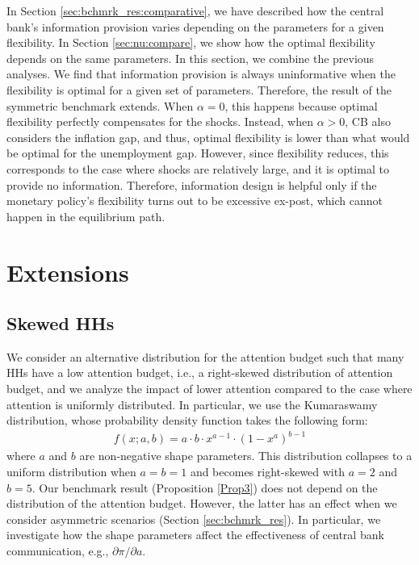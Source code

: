 \documentclass[12pt,a4paper]{article}
\begin{document}
In Section \ref{sec:bchmrk_res:comparative}, we have described how the central bank's information provision varies depending on the parameters for a given flexibility. In Section \ref{sec:nu:compare}, we show how the optimal flexibility depends on the same parameters. In this section, we combine the previous analyses. We find that information provision is always uninformative when the flexibility is optimal for a given set of parameters. Therefore, the result of the symmetric benchmark extends. When $\alpha=0$, this happens because optimal flexibility perfectly compensates for the shocks.
Instead, when $\alpha>0$, CB also considers the inflation gap, and thus, optimal flexibility is lower than what would be optimal for the unemployment gap. However, since flexibility reduces, this corresponds to the case where shocks are relatively large, and it is optimal to provide no information.
Therefore, information design is helpful only if the monetary policy's flexibility turns out to be excessive ex-post, which cannot happen in the equilibrium path.

\section{Extensions}

\subsection{Skewed HHs}
We consider an alternative distribution for the attention budget such that many HHs have a low attention budget, i.e., a right-skewed distribution of attention budget, and we analyze the impact of lower attention compared to the case where attention is uniformly distributed. In particular, we use the Kumaraswamy distribution, whose probability density function takes the following form:
\begin{align}
    f(x;a,b) = a \cdot b \cdot x^{a-1} \cdot (1-x^a)^{b-1}
\end{align}
where $a$ and $b$ are non-negative shape parameters. This distribution collapses to a uniform distribution when $a=b=1$ and becomes right-skewed with $a=2$ and $b=5$. Our benchmark result (Proposition \ref{Prop3}) does not depend on the distribution of the attention budget. However, the latter has an effect when we consider asymmetric scenarios (Section \ref{sec:bchmrk_res}). In particular, we investigate how the shape parameters affect the effectiveness of central bank communication, e.g., $\partial \pi/ \partial a$.
\end{document}
